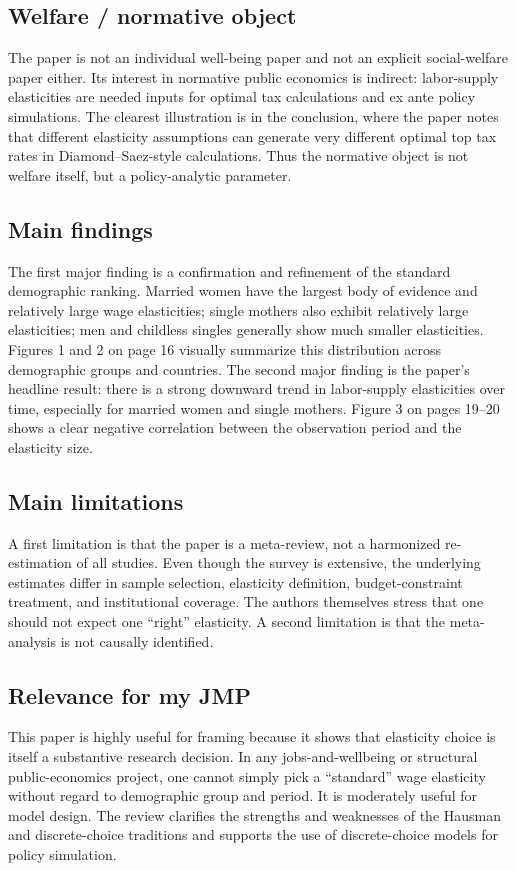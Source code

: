 \documentclass[11pt,a4paper]{article}
\begin{document}
\subsection*{Welfare / normative object}
The paper is not an individual well-being paper and not an explicit social-welfare paper either. Its interest in normative public economics is indirect: labor-supply elasticities are needed inputs for optimal tax calculations and ex ante policy simulations. The clearest illustration is in the conclusion, where the paper notes that different elasticity assumptions can generate very different optimal top tax rates in Diamond–Saez-style calculations. Thus the normative object is not welfare itself, but a policy-analytic parameter.

\subsection*{Main findings}
The first major finding is a confirmation and refinement of the standard demographic ranking. Married women have the largest body of evidence and relatively large wage elasticities; single mothers also exhibit relatively large elasticities; men and childless singles generally show much smaller elasticities. Figures 1 and 2 on page 16 visually summarize this distribution across demographic groups and countries. The second major finding is the paper’s headline result: there is a strong downward trend in labor-supply elasticities over time, especially for married women and single mothers. Figure 3 on pages 19–20 shows a clear negative correlation between the observation period and the elasticity size.

\subsection*{Main limitations}
A first limitation is that the paper is a meta-review, not a harmonized re-estimation of all studies. Even though the survey is extensive, the underlying estimates differ in sample selection, elasticity definition, budget-constraint treatment, and institutional coverage. The authors themselves stress that one should not expect one “right” elasticity. A second limitation is that the meta-analysis is not causally identified.

\subsection*{Relevance for my JMP}
This paper is highly useful for framing because it shows that elasticity choice is itself a substantive research decision. In any jobs-and-wellbeing or structural public-economics project, one cannot simply pick a “standard” wage elasticity without regard to demographic group and period. It is moderately useful for model design. The review clarifies the strengths and weaknesses of the Hausman and discrete-choice traditions and supports the use of discrete-choice models for policy simulation.
\end{document}
